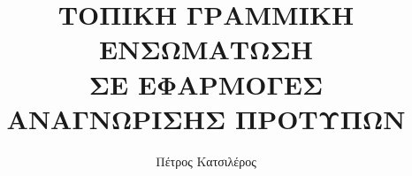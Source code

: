 \documentclass[a4paper,12pt,twoside]{report}
\begin{document}
\title{\LARGE {\bf ΤΟΠΙΚΗ ΓΡΑΜΜΙΚΗ ΕΝΣΩΜΑΤΩΣΗ \\ 
	    ΣΕ ΕΦΑΡΜΟΓΕΣ ΑΝΑΓΝΩΡΙΣΗΣ ΠΡΟΤΥΠΩΝ} \\
}

\author{Πέτρος Κατσιλέρος}

\maketitle

\preface






\cleardoublepage    
\tableofcontents

\cleardoublepage
\listoftables

\cleardoublepage
\listoffigures

\cleardoublepage












\medskip
\mbox{}




\nocite{8}
\nocite{9}
\nocite{10}
\nocite{11}
\nocite{12}
\nocite{13}
\nocite{14}
\end{document}
